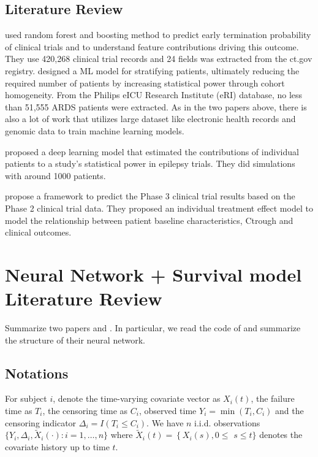 \documentclass[12pt]{article}
\begin{document}
\subsection{Literature Review}

\citep{kavalci2023improving} used random forest and boosting method to
predict early termination probability of clinical trials and to
understand feature contributions driving this outcome. They use
420,268 clinical trial records and 24 fields was extracted from the
ct.gov registry.  \citep{schwager2021utilizing} designed a ML model
for stratifying patients, ultimately reducing the required number of
patients by increasing statistical power through cohort
homogeneity. From the Philips eICU Research Institute (eRI) database,
no less than 51,555 ARDS patients were extracted. As in the two papers
above, there is also a lot of work that utilizes large dataset like
electronic health records and genomic data to train machine learning
models.

\citep{romero2020statistical} proposed a deep learning model that
estimated the contributions of individual patients to a study’s
statistical power in epilepsy trials. They did simulations with around
1000 patients.

\citep{qi2019predicting} propose a framework to predict the Phase 3
clinical trial results based on the Phase 2 clinical trial data. They
proposed an individual treatment eﬀect model to model the relationship
between patient baseline characteristics, Ctrough and clinical
outcomes.

\section{Neural Network + Survival model Literature Review}

Summarize two papers \citep{katzman2018deepsurv} and
\citep{hu2023conditional}. In particular, we read the code of
\citep{hu2023conditional} and summarize the structure of their neural
network.

\subsection{Notations}

For subject $i$, denote the time-varying covariate vector as
$X_{i}(t)$, the failure time as $T_i$, the censoring time as $C_i$,
observed time $Y_i=\min \left( T_i, C_i \right)$ and the censoring
indicator $\Delta_i=I(T_i \leq C_i)$. We have $n$ i.i.d. observations
$\{Y_i, \Delta_i, \tilde{X}_i(\cdot): i=1, \ldots, n\}$ where
$\tilde{X}_i(t)=\left\{X_i(s), 0 \leq\right.$ $s \leq t\}$ denotes the
covariate history up to time $t$.
\end{document}

